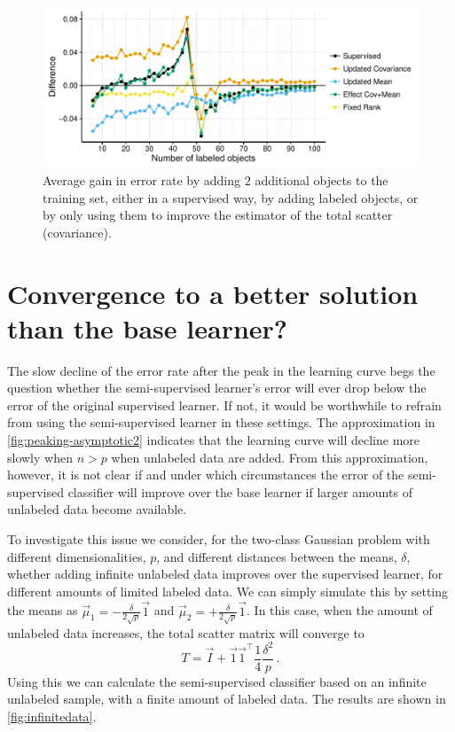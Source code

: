 \documentclass[runningheads,a4paper]{llncs}\usepackage[]{graphicx}\usepackage[]{color}
\makeatletter
\def\maxwidth{ %
  \ifdim\Gin@nat@width>\linewidth
    \linewidth
  \else
    \Gin@nat@width
  \fi
}
\newenvironment{knitrout}{}{} %
\makeatother
\begin{document}
\begin{knitrout}
\color{fgcolor}\begin{figure}
\includegraphics[width=\maxwidth]{figure/contributions-1} \caption[Average gain in error rate by adding ]{Average gain in error rate by adding $2$ additional objects to the training set, either in a supervised way, by adding labeled objects, or by only using them to improve the estimator of the total scatter (covariance).}\label{fig:contributions}
\end{figure}


\end{knitrout}

\section{Convergence to a better solution than the base learner?} \label{section:decline}
The slow decline of the error rate after the peak in the learning curve begs the question whether the semi-supervised learner's error will ever drop below the error of the original supervised learner. If not, it would be worthwhile to refrain from using the semi-supervised learner in these settings.  The approximation in \cref{fig:peaking-asymptotic2} indicates that the learning curve will decline more slowly when $n>p$ when unlabeled data are added. From this approximation, however, it is not clear if and under which circumstances the error of the semi-supervised classifier will improve over the base learner if larger amounts of unlabeled data become available.

To investigate this issue we consider, for the two-class Gaussian problem with different dimensionalities, $p$, and different distances between the means, $\delta$, whether adding infinite unlabeled data improves over the supervised learner, for different amounts of limited labeled data. We can simply simulate this by setting the means as $\vec{\mu}_1=-\tfrac{\delta}{2 \sqrt{p}}\vec{1}$ and $\vec{\mu}_2=+\tfrac{\delta}{2 \sqrt{p}}\vec{1}$. In this case, when the amount of unlabeled data increases, the total scatter matrix will converge to
$$
T = \vec{I} + \vec{1} \vec{1}^\top \frac{1}{4} \frac{\delta^2}{p} \,.
$$
Using this we can calculate the semi-supervised classifier based on an infinite unlabeled sample, with a finite amount of labeled data. The results are shown in \cref{fig:infinitedata}.
\end{document}

